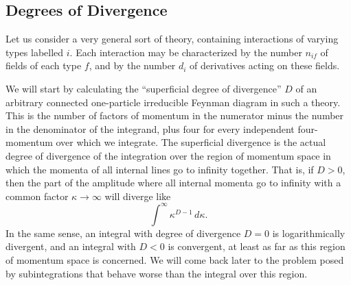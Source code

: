 
\subsection{Degrees of Divergence}

Let us consider a very general sort of theory, containing interactions of
varying types labelled $i$. Each interaction may be characterized by the
number $n_{if}$ of fields of each type $f$, and by the number $d_i$ of
derivatives acting on these fields.

We will start by calculating the ``superficial degree of divergence'' $D$ of
an arbitrary connected one-particle irreducible Feynman diagram in such a
theory. This is the number of factors of momentum in the numerator minus the
number in the denominator of the integrand, plus four for every independent
four-momentum over which we integrate. The superficial divergence is the
actual degree of divergence of the integration over the region of momentum
space in which the momenta of all internal lines go to infinity together.
That is, if $D>0$, then the part of the amplitude where all internal momenta
go to infinity with a common factor $\kappa\to\infty$ will diverge like
\begin{equation}
  \int^\infty \kappa^{D-1}\,d\kappa.
  \tag{12.1.1}\label{eq:12.1.1}
\end{equation}
In the same sense, an integral with degree of divergence $D=0$ is
logarithmically divergent, and an integral with $D<0$ is convergent, at least
as far as this region of momentum space is concerned. We will come back later
to the problem posed by subintegrations that behave worse than the integral
over this region.

